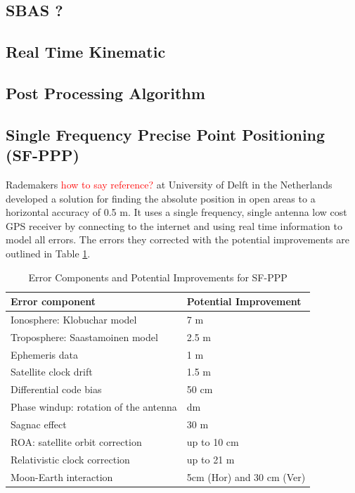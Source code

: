 \subsection{SBAS  ?}

\subsection{Real Time Kinematic}

\subsection{Post Processing Algorithm}

\subsection{Single Frequency Precise Point Positioning (SF-PPP)}
Rademakers \textcolor{red}{how to say reference?} at University of Delft in the Netherlands developed a solution for finding the absolute position in open areas to a horizontal accuracy of 0.5 m. It uses a single frequency, single antenna low cost GPS receiver by connecting to the internet and using real time information to model all errors. The errors they corrected with the potential improvements are outlined in Table \ref{Table:SFPPP error table}. 
\begin{table}
\centering
\caption{Error Components and Potential Improvements for SF-PPP}
\label{Table:SFPPP error table}
\begin{tabular}{|l|l|}
\hline
\textbf{Error component} &\textbf{ Potential Improvement} \\\hline
 Ionosphere: Klobuchar model & 7 m \\\hline
 Troposphere: Saastamoinen model & 2.5 m \\\hline
Ephemeris data &  1 m \\\hline
 Satellite clock drift & 1.5 m \\\hline
 Differential code bias & 50 cm \\\hline
 Phase windup: rotation of the antenna & dm \\\hline
 Sagnac effect & 30 m \\\hline
 ROA: satellite orbit correction & up to 10 cm \\\hline
 Relativistic clock correction & up to 21 m \\\hline
 Moon-Earth interaction & 5cm (Hor) and 30 cm (Ver)\\\hline
\end{tabular}
\end{table}


